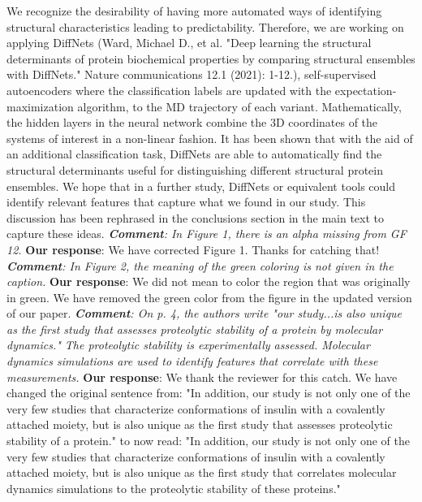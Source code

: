\documentclass[9pt]{elife}
\begin{document}
We recognize the desirability of having more automated ways of identifying structural characteristics leading to predictability. Therefore, we are working on applying DiffNets (Ward, Michael D., et al. "Deep learning the structural determinants of protein biochemical properties by comparing structural ensembles with DiffNets." Nature communications 12.1 (2021): 1-12.), self-supervised autoencoders where the classification labels are updated with the expectation-maximization algorithm, to the MD trajectory of each variant. Mathematically, the hidden layers in the neural network combine the 3D coordinates of the systems of interest in a non-linear fashion. It has been shown that with the aid of an additional classification task, DiffNets are able to automatically find the structural determinants useful for distinguishing different structural protein ensembles. We hope that in a further study, DiffNets or equivalent tools could identify relevant features that capture what we found in our study. This discussion has been rephrased in the conclusions section in the main text to capture these ideas.
\newline
\newline
\indent
\textit{\textbf{Comment}:
In Figure 1, there is an alpha missing from GF 12.}
\newline
\indent 
{\bf Our response}:
We have corrected Figure 1. Thanks for catching that!
\newline
\newline
\indent
\textit{\textbf{Comment}:
In Figure 2, the meaning of the green coloring is not given in the caption.}
\newline
\indent 
{\bf Our response}:
We did not mean to color the region that was originally in green. We have removed the green color from the figure in the updated version of our paper. 
\newline
\newline
\indent
\textit{\textbf{Comment}:
On p. 4, the authors write "our study...is also unique as the first study that assesses proteolytic stability of a protein by molecular dynamics." The proteolytic stability is experimentally assessed.  Molecular dynamics simulations are used to identify features that correlate with these measurements.}
\newline
\indent 
{\bf Our response}: 
We thank the reviewer for this catch. We have changed the original sentence from:
\newline
"In addition, our study is not only one of the very few studies that characterize conformations of insulin with a covalently attached moiety, but is also unique as the first study that assesses proteolytic stability of a protein." to now read: "In addition, our study is not only one of the very few studies that characterize conformations of insulin with a covalently attached moiety, but is also unique as the first study that correlates molecular dynamics simulations to the proteolytic stability of these proteins."
\end{document}
